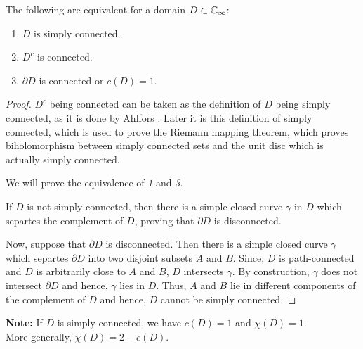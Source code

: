 \begin{theorem}\label{thm1.1}
	The following are equivalent for a domain \( D\subset \mathbb{C}_\infty \):
	\begin{enumerate}
		\item \( D \) is simply connected.
		\item \( D^c \) is connected.
		\item \( \partial D \) is connected or \( c(D)=1 \).
	\end{enumerate}
\end{theorem}
\begin{proof}
	\( D^c \) being connected can be taken as the definition of \( D \) being simply connected, as it is done by Ahlfors \parencite{ahlfors}.
	Later it is this definition of simply connected, which is used to prove the Riemann mapping theorem, which proves biholomorphism
	between simply connected sets and the unit disc which is actually simply connected.

	We will prove the equivalence of \emph{1} and \emph{3}.

	If \( D \) is not simply connected, then there is a simple closed curve \( \gamma \) in \( D \) which 
	separtes the complement of \( D \), proving that \( \partial D \) is disconnected.

	Now, suppose that \( \partial D \) is disconnected. Then there is a simple closed curve \( \gamma \) which
	separtes \( \partial D \) into two disjoint subsets \( A \) and \( B \). Since, \( D \) is path-connected and
	\( D \) is arbitrarily close to \( A \) and \( B \), \( D \) intersects \( \gamma \). By construction, \(\gamma\) does
	not intersect \( \partial D \) and hence, \( \gamma\) lies in \( D \). Thus, \( A \) and \( B \) lie in different
	components of the complement of \( D \) and hence, \( D \) cannot be simply connected.
\end{proof}

\noindent \textbf{Note:} If \( D \) is simply connected, we have \( c(D)=1 \) and \( \chi(D)=1 \).\\
More generally, \( \chi(D)=2-c(D) \).


